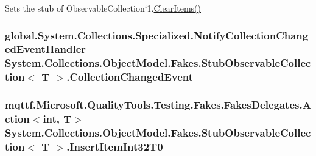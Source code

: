 Sets the stub of Observable\-Collection`1.\hyperlink{class_system_1_1_collections_1_1_object_model_1_1_fakes_1_1_stub_observable_collection_3_01_t_01_4_a09bb744b299385dd15380cd3cc73af2d}{Clear\-Items()}

\hypertarget{class_system_1_1_collections_1_1_object_model_1_1_fakes_1_1_stub_observable_collection_3_01_t_01_4_a1c9704046b1fd58ff8088c70534b4f0c}{
\subsubsection[{Collection\-Changed\-Event}]{\setlength{\rightskip}{0pt plus 5cm}global.\-System.\-Collections.\-Specialized.\-Notify\-Collection\-Changed\-Event\-Handler System.\-Collections.\-Object\-Model.\-Fakes.\-Stub\-Observable\-Collection$<$ T $>$.Collection\-Changed\-Event}}\label{class_system_1_1_collections_1_1_object_model_1_1_fakes_1_1_stub_observable_collection_3_01_t_01_4_a1c9704046b1fd58ff8088c70534b4f0c}
\hypertarget{class_system_1_1_collections_1_1_object_model_1_1_fakes_1_1_stub_observable_collection_3_01_t_01_4_aef25a00a01d4287edaa8471d7aa97264}{
\subsubsection[{Insert\-Item\-Int32\-T0}]{\setlength{\rightskip}{0pt plus 5cm}mqttf.\-Microsoft.\-Quality\-Tools.\-Testing.\-Fakes.\-Fakes\-Delegates.\-Action$<$int, T$>$ System.\-Collections.\-Object\-Model.\-Fakes.\-Stub\-Observable\-Collection$<$ T $>$.Insert\-Item\-Int32\-T0}}\label{class_system_1_1_collections_1_1_object_model_1_1_fakes_1_1_stub_observable_collection_3_01_t_01_4_aef25a00a01d4287edaa8471d7aa97264}


